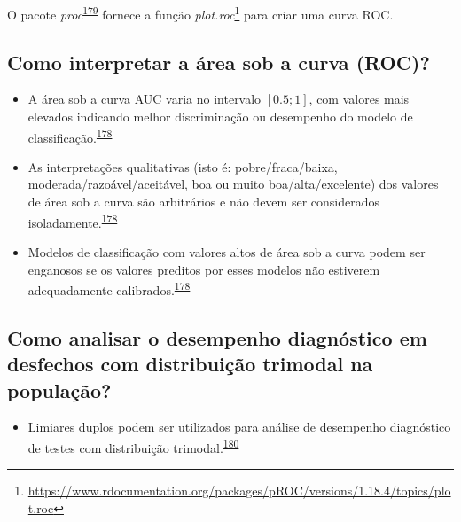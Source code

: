 \documentclass[
  a4paper,
]{book}
\providecommand{\tightlist}{%
  \setlength{\itemsep}{0pt}\setlength{\parskip}{0pt}}
\renewcommand{\href}[2]{#2\footnote{\url{#1}}}
\newenvironment{infobox}[1]
  {
  \begin{itemize}
  \renewcommand{\labelitemi}{
    \raisebox{-.7\height}[0pt][0pt]{
      {\setkeys{Gin}{width=3em,keepaspectratio}
        \texttt{[image: \#1]}}
    }
  }
  \setlength{\fboxsep}{1em}
  \begin{blackbox}
  \item
  }
  {
  \end{blackbox}
  \end{itemize}
  }
\begin{document}
\begin{infobox}{images/Rlogo}
O pacote \emph{proc}\textsuperscript{\protect\hyperlink{ref-pROC}{179}} fornece a função \href{https://www.rdocumentation.org/packages/pROC/versions/1.18.4/topics/plot.roc}{\emph{plot.roc}} para criar uma curva ROC.

\end{infobox}

\hypertarget{como-interpretar-a-uxe1rea-sob-a-curva-roc}{%
\subsection{Como interpretar a área sob a curva (ROC)?}\label{como-interpretar-a-uxe1rea-sob-a-curva-roc}}

\begin{itemize}
\item
  A área sob a curva AUC varia no intervalo \([0.5; 1]\), com valores mais elevados indicando melhor discriminação ou desempenho do modelo de classificação.\textsuperscript{\protect\hyperlink{ref-de2022}{178}}
\item
  As interpretações qualitativas (isto é: pobre/fraca/baixa, moderada/razoável/aceitável, boa ou muito boa/alta/excelente) dos valores de área sob a curva são arbitrários e não devem ser considerados isoladamente.\textsuperscript{\protect\hyperlink{ref-de2022}{178}}
\item
  Modelos de classificação com valores altos de área sob a curva podem ser enganosos se os valores preditos por esses modelos não estiverem adequadamente calibrados.\textsuperscript{\protect\hyperlink{ref-de2022}{178}}
\end{itemize}

\hypertarget{como-analisar-o-desempenho-diagnuxf3stico-em-desfechos-com-distribuiuxe7uxe3o-trimodal-na-populauxe7uxe3o}{%
\subsection{Como analisar o desempenho diagnóstico em desfechos com distribuição trimodal na população?}\label{como-analisar-o-desempenho-diagnuxf3stico-em-desfechos-com-distribuiuxe7uxe3o-trimodal-na-populauxe7uxe3o}}

\begin{itemize}
\tightlist
\item
  Limiares duplos podem ser utilizados para análise de desempenho diagnóstico de testes com distribuição trimodal.\textsuperscript{\protect\hyperlink{ref-ferreira2021}{180}}
\end{itemize}
\end{document}
